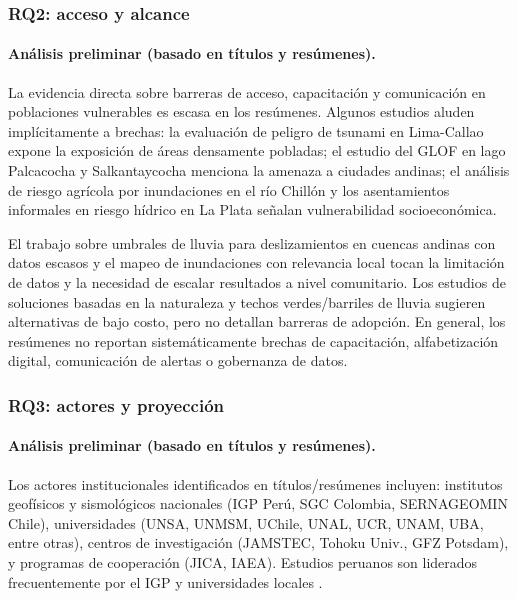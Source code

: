 \documentclass[12pt,a4paper]{article}
\begin{document}
\subsubsection{RQ2: acceso y alcance}
\label{sec:rq2}
\paragraph*{Análisis preliminar (basado en títulos y resúmenes).}
La evidencia directa sobre barreras de acceso, capacitación y comunicación en poblaciones vulnerables es escasa en los resúmenes. Algunos estudios aluden implícitamente a brechas: la evaluación de peligro de tsunami en Lima-Callao \parencite{quesquen2025tsunami, androsov2024nonlinear, garcia2025parallel} expone la exposición de áreas densamente pobladas; el estudio del GLOF en lago Palcacocha \parencite{stuartsmith2021increased} y Salkantaycocha \parencite{vilca2021glacial} menciona la amenaza a ciudades andinas; el análisis de riesgo agrícola por inundaciones en el río Chillón \parencite{lpezsilva2025spatial} y los asentamientos informales en riesgo hídrico en La Plata \parencite{gonzlezbiffis2022asentamientos} señalan vulnerabilidad socioeconómica. 

El trabajo sobre umbrales de lluvia para deslizamientos en cuencas andinas con datos escasos \parencite{marin2021assessing} y el mapeo de inundaciones con relevancia local \parencite{kuchinski2025regional} tocan la limitación de datos y la necesidad de escalar resultados a nivel comunitario. Los estudios de soluciones basadas en la naturaleza \parencite{rivillasospina2025numerical} y techos verdes/barriles de lluvia \parencite{figueroaavalos2024evaluaci} sugieren alternativas de bajo costo, pero no detallan barreras de adopción. En general, los resúmenes no reportan sistemáticamente brechas de capacitación, alfabetización digital, comunicación de alertas o gobernanza de datos.

\subsubsection{RQ3: actores y proyección}
\label{sec:rq3}
\paragraph*{Análisis preliminar (basado en títulos y resúmenes).}
Los actores institucionales identificados en títulos/resúmenes incluyen: institutos geofísicos y sismológicos nacionales (IGP Perú, SGC Colombia, SERNAGEOMIN Chile), universidades (UNSA, UNMSM, UChile, UNAL, UCR, UNAM, UBA, entre otras), centros de investigación (JAMSTEC, Tohoku Univ., GFZ Potsdam), y programas de cooperación (JICA, IAEA). Estudios peruanos son liderados frecuentemente por el IGP y universidades locales \parencite{jimnez2023numerical, jimnez2021seismic, jimnez2023seismic, jimenez2024numerical, jimenez2025numerical, jimnez2021seismic2, flores2026numerical, cuadrosrojas2024photogrammetry, aroquipa2025methodological, fernandezmorocho2026root}. 
\end{document}
